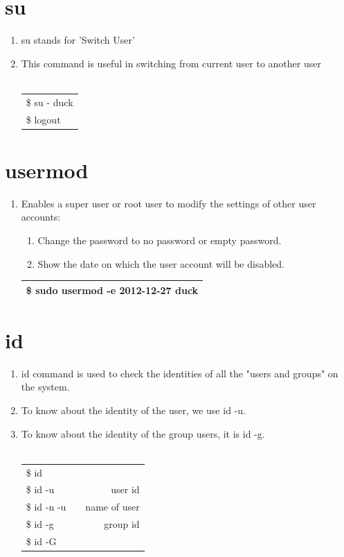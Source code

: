 \documentclass[12pt, a4paper]{report}
\begin{document}
\section{su}
\begin{enumerate}
\item su stands for 'Switch User'
\item This command is useful in switching from current user to another user\\
\\
\begin{tabular}{|l|}\hline
\$ su - duck\\
\$ logout\\ \hline
\end{tabular}
\end{enumerate}
\section{usermod}
\begin{enumerate}
\item Enables a super user or root user to modify the settings of other user accounts:
\begin{enumerate}
\item Change the password to no password or empty password.
\item Show the date on which the user account will be disabled.
\end{enumerate}
\begin{tabular}{|l|}\hline
\$ sudo usermod -e 2012-12-27 duck\\ \hline
\end{tabular}
\end{enumerate}
\section{id}
\begin{enumerate}
\item id command is used to check the identities of all the "users and groups" on the system.
\item To know about the identity of the user, we use id -u.
\item To know about the identity of the group users, it is id -g.\\
\\
\begin{tabular}{|lcr|}\hline
\$ id && \\
\$ id -u && user id\\
\$ id -n -u && name of user\\
\$ id -g && group id\\
\$ id -G && \\ \hline
\end{tabular}
\end{enumerate}
\end{document}
